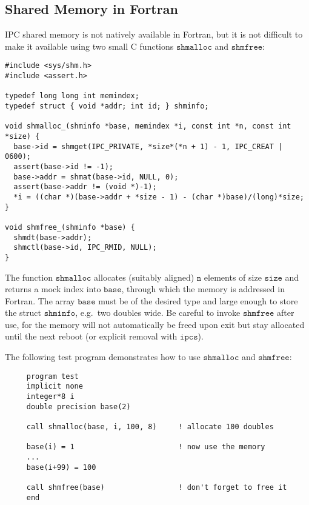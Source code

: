 \documentclass[12pt]{article}
\newcommand\eg{e.g.\ }
\newcommand\Code[1]{\ensuremath{\texttt{#1}}}
\begin{document}
\begin{appendix}

\section{Shared Memory in Fortran}
\label{app:shm}

IPC shared memory is not natively available in Fortran, but it is not 
difficult to make it available using two small C functions 
\Code{shmalloc} and \Code{shmfree}:
\begin{verbatim}
#include <sys/shm.h>
#include <assert.h>

typedef long long int memindex;
typedef struct { void *addr; int id; } shminfo;

void shmalloc_(shminfo *base, memindex *i, const int *n, const int *size) {
  base->id = shmget(IPC_PRIVATE, *size*(*n + 1) - 1, IPC_CREAT | 0600);
  assert(base->id != -1);
  base->addr = shmat(base->id, NULL, 0);
  assert(base->addr != (void *)-1);
  *i = ((char *)(base->addr + *size - 1) - (char *)base)/(long)*size;
}

void shmfree_(shminfo *base) {
  shmdt(base->addr);
  shmctl(base->id, IPC_RMID, NULL);
}
\end{verbatim}
The function \Code{shmalloc} allocates (suitably aligned) \Code{n} 
elements of size \Code{size} and returns a mock index into \Code{base}, 
through which the memory is addressed in Fortran.  The array \Code{base} 
must be of the desired type and large enough to store the struct 
\Code{shminfo}, \eg two doubles wide.  Be careful to invoke 
\Code{shmfree} after use, for the memory will not automatically be freed 
upon exit but stay allocated until the next reboot (or explicit removal 
with \Code{ipcs}).

The following test program demonstrates how to use \Code{shmalloc} and 
\Code{shmfree}:
\begin{verbatim}
     program test
     implicit none
     integer*8 i
     double precision base(2)

     call shmalloc(base, i, 100, 8)     ! allocate 100 doubles

     base(i) = 1                        ! now use the memory
     ...
     base(i+99) = 100

     call shmfree(base)                 ! don't forget to free it
     end
\end{verbatim}

\end{appendix}
\end{document}

